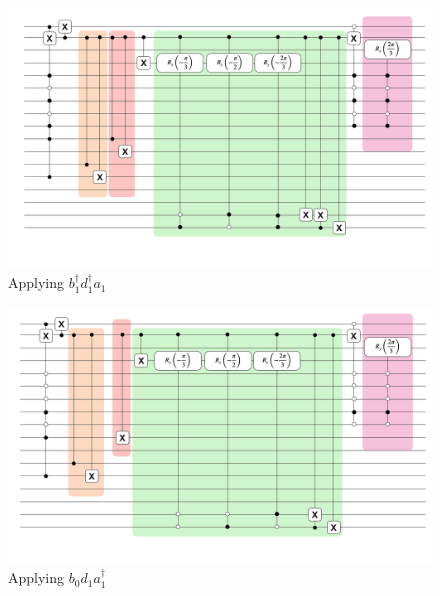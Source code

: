 \begin{figure}[h]
    \includegraphics[width = \linewidth]{figures/pair_create.png}
    \caption{Applying $b_1^\dagger d_1^\dagger a_1$}
\end{figure}

\begin{figure}[h]
    \includegraphics[width = \linewidth]{figures/pair_annihilate.png}
    \caption{Applying $b_0d_1a_1^\dagger$}
\end{figure}